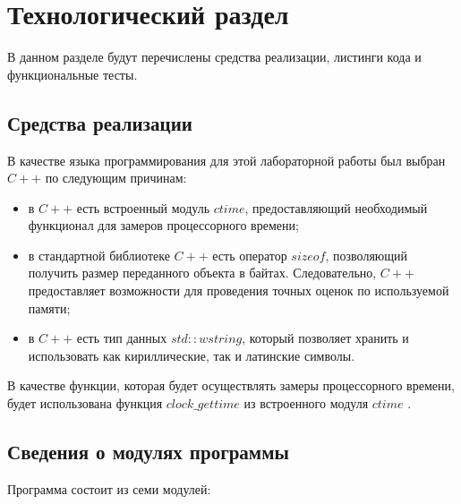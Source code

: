 \chapter{Технологический раздел}

В данном разделе будут перечислены средства реализации, листинги кода и функциональные тесты.

\section{Средства реализации}

В качестве языка программирования для этой лабораторной работы был выбран $C++$ \cite{pl} по следующим причинам:

\begin{itemize}[label=--]
	\item в $C++$ есть встроенный модуль $ctime$, предоставляющий необходимый функционал для замеров процессорного времени;
	\item в стандартной библиотеке $C++$ есть оператор $sizeof$, позволяющий получить размер переданного объекта в байтах. Следовательно, $C++$ предоставляет возможности для проведения точных оценок по используемой памяти;
	\item в $C++$ есть тип данных $std::wstring$, который позволяет хранить и использовать как кириллические, так и латинские символы.
\end{itemize}

В качестве функции, которая будет осуществлять замеры процессорного времени, будет использована функция $clock\_gettime$ из встроенного модуля $ctime$ \cite{cpu_time_func}.

\section{Сведения о модулях программы}

Программа состоит из семи модулей: 

